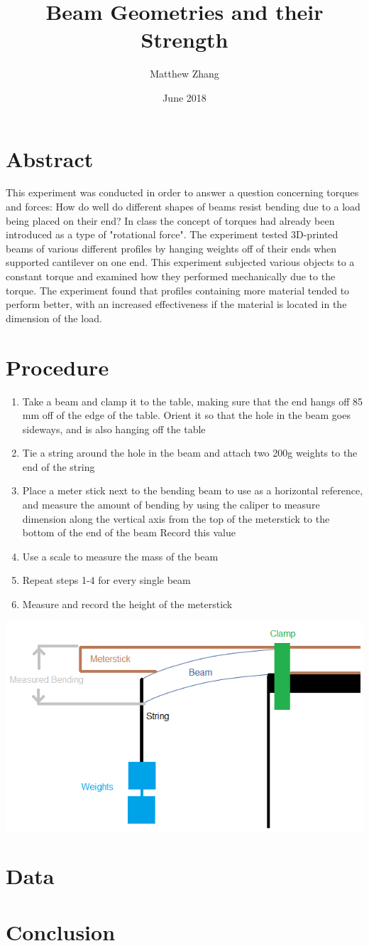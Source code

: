 \documentclass{article}
\title{Beam Geometries and their Strength}
\author{Matthew Zhang}
\date{June 2018}
\begin{document}
\maketitle


\section*{Abstract}
This experiment was conducted in order to answer a question concerning torques and forces: How do well do different shapes of beams resist bending due to a load being placed on their end? In class the concept of torques had already been introduced as a type of "rotational force". The experiment tested 3D-printed beams of various different profiles by hanging weights off of their ends when supported cantilever on one end. This experiment subjected various objects to a constant torque and examined how they performed mechanically due to the torque. The experiment found that profiles containing more material tended to perform better, with an increased effectiveness if the material is located in the dimension of the load.



\section*{Procedure}
\begin{enumerate}
\item 
Take a beam and clamp it to the table, making sure that the end hangs off 85 mm off of the edge of the table. Orient it so that the hole in the beam goes sideways, and is also hanging off the table
\item
Tie a string around the hole in the beam and attach two 200g weights to the end of the string
\item
Place a meter stick next to the bending beam to use as a horizontal reference, and measure the amount of bending by using the caliper to measure dimension along the vertical axis from the top of the meterstick to the bottom of the end of the beam
Record this value
\item
Use a scale to measure the mass of the beam
\item
Repeat steps 1-4 for every single beam
\item
Measure and record the height of the meterstick
\end{enumerate}
\begin{center}
	\includegraphics[width=.8\linewidth]{whysicDiagram.png}
\end{center}

\section*{Data}


\section*{Conclusion}
\end{document}
